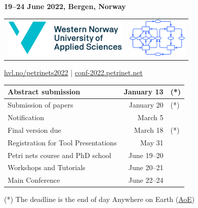 \documentclass[10pt]{article}
\begin{document}
\begin{multicols}{2}

\begin{center}
{\large\bf
19--24 June 2022, Bergen, Norway}

\smallskip


\begin{tabular}{cc}

\includegraphics[height=1.9cm]{logos/hvl-logo.png} &

\includegraphics[height=1.9cm]{logos/LogoPN.pdf}



\end{tabular}

\href{https://hvl.no/petrinets2022}{hvl.no/petrinets2022} | \href{http://conf-2022.petrinet.net}{conf-2022.petrinet.net}


\end{center}

\columnbreak

{\small
\begin{center}

\begin{tabular}{|l|r@{, 2022 }l|}
\hline
Abstract submission & January 13 & (*) \\
\hline
Submission of papers & January 20 & (*) \\
\hline
Notification & March 5 & \\
\hline
Final version due & March 18 & (*) \\
\hline
Registration for Tool Presentations & May 31 & \\
\hline
Petri nets course and PhD school & June 19--20 & \\
\hline
Workshops and Tutorials & June 20--21 & \\
\hline
Main Conference & June 22--24 & \\
\hline
\end{tabular}

\smallskip

{\small (*) The deadline is the end of day Anywhere on Earth (\href{https://en.wikipedia.org/wiki/Anywhere_on_Earth}{AoE})}
\end{center}}

\end{multicols}
\end{document}
